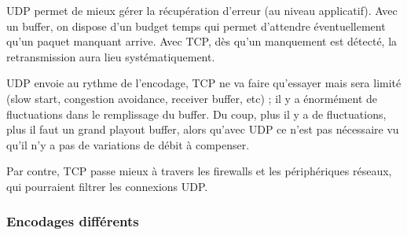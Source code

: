 \documentclass[10pt,a4paper]{report}
\begin{document}
			
				
			
			
		
			UDP permet de mieux gérer la récupération d'erreur (au niveau applicatif). Avec un buffer, on dispose d'un budget temps qui permet d'attendre éventuellement qu'un paquet manquant arrive. Avec TCP, dès qu'un manquement est détecté, la retransmission aura lieu systématiquement.
		
			UDP envoie au rythme de l'encodage, TCP ne va faire qu'essayer mais sera limité (slow start, congestion avoidance, receiver buffer, etc) ; il y a énormément de fluctuations dans le remplissage du buffer. Du coup, plus il y a de fluctuations, plus il faut un grand playout buffer, alors qu'avec UDP ce n'est pas nécessaire vu qu'il n'y a pas de variations de débit à compenser.
		
			Par contre, TCP passe mieux à travers les firewalls et les périphériques réseaux, qui pourraient filtrer les connexions UDP.
			
			\subsubsection{Encodages différents}
			
\end{document}
